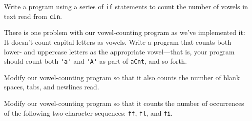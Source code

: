 %
%
\begin{question}
Write a program using a series of \verb|if| statements to count the
number of vowels in text read from \verb|cin|.
\end{question}

\begin{question}
There is one problem with our vowel-counting program as
we’ve implemented it: It doesn’t count capital letters as vowels. Write a
program that counts both lower- and uppercase letters as the appropriate
vowel—that is, your program should count both \verb|'a'| and \verb|'A'| as part of
\verb|aCnt|, and so forth.
\end{question}

\begin{question}
Modify our vowel-counting program so that it also counts the
number of blank spaces, tabs, and newlines read.
\end{question}

\begin{question}
Modify our vowel-counting program so that it counts the
number of occurrences of the following two-character sequences: \verb|ff|, \verb|fl|,
and \verb|fi|.
\end{question}

